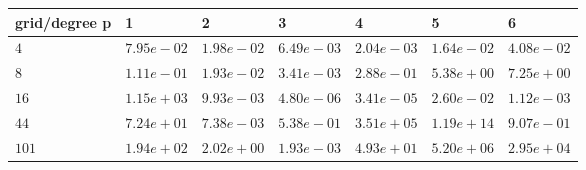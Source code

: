 \begin{tabular}{lllllll}
\hline
 grid/degree p   & 1          & 2          & 3          & 4          & 5          & 6          \\
\hline
 $4$             & $7.95e-02$ & $1.98e-02$ & $6.49e-03$ & $2.04e-03$ & $1.64e-02$ & $4.08e-02$ \\
 $8$             & $1.11e-01$ & $1.93e-02$ & $3.41e-03$ & $2.88e-01$ & $5.38e+00$ & $7.25e+00$ \\
 $16$            & $1.15e+03$ & $9.93e-03$ & $4.80e-06$ & $3.41e-05$ & $2.60e-02$ & $1.12e-03$ \\
 $44$            & $7.24e+01$ & $7.38e-03$ & $5.38e-01$ & $3.51e+05$ & $1.19e+14$ & $9.07e-01$ \\
 $101$           & $1.94e+02$ & $2.02e+00$ & $1.93e-03$ & $4.93e+01$ & $5.20e+06$ & $2.95e+04$ \\
\hline
\end{tabular}